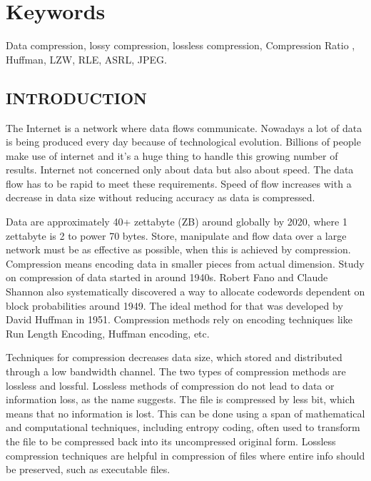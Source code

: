 \documentclass[a4paper, 12pt]{article}
\begin{document}
\section*{Keywords}
Data compression, lossy compression, lossless compression, Compression Ratio ,
Huffman, LZW, RLE, ASRL, JPEG.
\newpage
{}
\begin{center}
\section{INTRODUCTION}
\end{center}
\par
The Internet is a network where data flows communicate. Nowadays a lot of data is being produced every day because of technological evolution. Billions of people make use of internet and it's a huge thing to handle this growing number of results. Internet not concerned only about data but also about speed. The data flow has to be rapid to meet these requirements. Speed of 
flow increases with a decrease in data size without reducing accuracy as data is compressed.
 \\ 
\par Data are approximately 40+ zettabyte (ZB) around globally by 2020, where 1 zettabyte is 2 to power 70 bytes. Store, manipulate and flow data over a large network must be as effective as possible, when this is achieved by compression. Compression means encoding data in smaller pieces from actual dimension. Study on compression of data started in around 1940s. Robert Fano and Claude Shannon also systematically discovered a way to allocate codewords dependent on block probabilities around 1949. The ideal method for that was developed by David Huffman in 1951. Compression methods rely on encoding techniques like Run Length Encoding, Huffman encoding, etc.
\\

\par Techniques for compression decreases data size, which stored and distributed through a low bandwidth channel. The two types of compression methods are lossless and lossful. Lossless methods of compression do not lead to data or information loss, as the name suggests. The file is compressed by less bit, which means that no information is lost. This can be done using a span of mathematical and computational techniques, including entropy coding, often used to transform the file to be compressed back into its uncompressed original form. Lossless compression techniques are helpful in compression of files where entire info should be preserved, such as executable files.
\\
\end{document}
